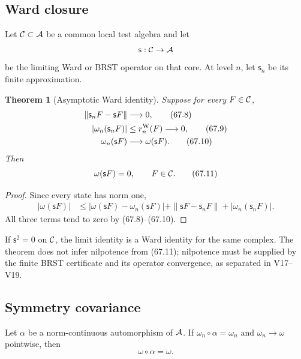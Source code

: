 \documentclass[11pt]{article}
\newtheorem{theorem}{Theorem}[section]
\theoremstyle{remark}
\begin{document}
\subsection{Ward closure}

Let \({\cal C}\subset{\cal A}\) be a common local test algebra and
let
\[
 {\mathsf s}:{\cal C}\to{\cal A}
\]
be the limiting Ward or BRST operator on that core.  At level \(n\),
let \({\mathsf s}_n\) be its finite approximation.

\begin{theorem}[Asymptotic Ward identity]
\label{thm:v12v67-Ward}
Suppose for every \(F\in{\cal C}\),
\begin{align}
 \|{\mathsf s}_nF-{\mathsf s}F\|
 &\longrightarrow0,                              \tag{67.8}\\
 |\omega_n({\mathsf s}_nF)|
 &\leq r_n^{\rm W}(F)\longrightarrow0,            \tag{67.9}\\
 \omega_n({\mathsf s}F)
 &\longrightarrow\omega({\mathsf s}F).            \tag{67.10}
\end{align}
Then
\begin{equation}
                         \omega({\mathsf s}F)=0,
 \qquad F\in{\cal C}.                             \tag{67.11}
\end{equation}
\end{theorem}

\begin{proof}
Since every state has norm one,
\begin{align}
 |\omega({\mathsf s}F)|
 &\leq
 |\omega({\mathsf s}F)-\omega_n({\mathsf s}F)|
 +\|{\mathsf s}F-{\mathsf s}_nF\|
 +|\omega_n({\mathsf s}_nF)|.
\end{align}
All three terms tend to zero by (67.8)--(67.10).
\end{proof}

If \({\mathsf s}^2=0\) on \({\cal C}\), the limit identity is a Ward
identity for the same complex.  The theorem does not infer
nilpotence from (67.11); nilpotence must be supplied by the finite
BRST certificate and its operator convergence, as separated in
V17--V19.

\subsection{Symmetry covariance}

Let \(\alpha\) be a norm-continuous automorphism of \({\cal A}\).
If \(\omega_n\circ\alpha=\omega_n\) and
\(\omega_n\to\omega\) pointwise, then
\begin{equation}
                         \omega\circ\alpha=\omega.             \tag{67.12}
\end{equation}
\end{document}

